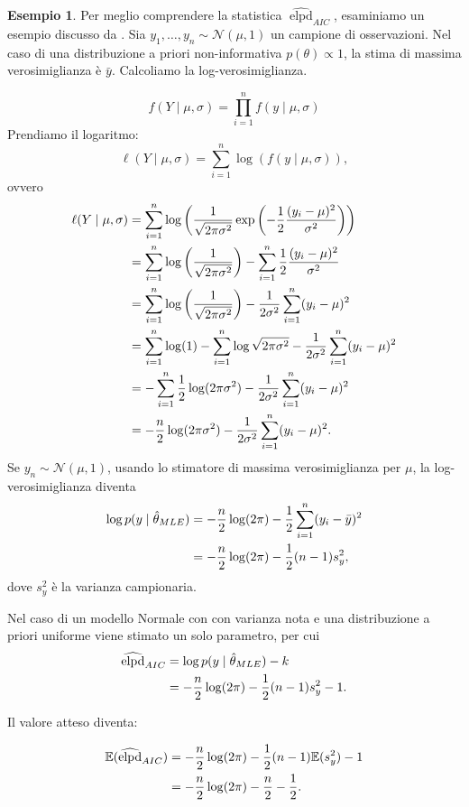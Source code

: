 \documentclass[
  10pt,
  italian,
  a4paper,
  extrafontsizes,onecolumn,openright
  ]{memoir}
\newcommand{\E}{\mathbb{E}} %
\DeclareMathOperator{\elpd}{elpd} %
\theoremstyle{definition}
\theoremstyle{definition}
\newtheorem{example}{Esempio}[chapter]
\theoremstyle{definition}
\theoremstyle{definition}
\theoremstyle{remark}
\begin{document}
\begin{example}
Per meglio comprendere la statistica \(\widehat{\elpd}_{AIC}\), esaminiamo un esempio discusso da \textcite{gelman2014understanding}. Sia \(y_1, \dots, y_n \sim \mathcal{N}(\mu, 1)\) un campione di osservazioni. Nel caso di una distribuzione a priori non-informativa \(p(\theta) \propto 1\), la stima di massima verosimiglianza è \(\bar{y}\). Calcoliamo la log-verosimiglianza.

\[
f(Y \mid \mu, \sigma) = \prod_{i=1}^n f(y \mid \mu, \sigma)
\]
Prendiamo il logaritmo:
\[
\ell(Y \mid \mu, \sigma) = \sum_{i=1}^n \log (f(y \mid \mu, \sigma)),
\]
ovvero
\begin{align}
\ell(Y \mid \mu, \sigma) &= \sum_{i=1}^n \log \left( \frac {1}{{\sqrt {2\pi\sigma^2 }}}\exp \left(-{\frac {1}{2}}{\frac {(y_i-\mu )^{2}}{\sigma^{2}}}\right) \right)\notag\\
&= \sum_{i=1}^n \log \left( \frac {1}{{\sqrt {2\pi \sigma^2}}} \right) - \sum_{i=1}^n{\frac {1}{2}}{\frac {(y_i-\mu )^{2}}{\sigma ^{2}}} \notag\\
&= \sum_{i=1}^n \log \left( \frac {1}{{\sqrt {2\pi \sigma^2}}} \right) - \frac{1}{2\sigma^2}\sum_{i=1}^n (y_i-\mu )^{2} \notag \\
&= \sum_{i=1}^n \log (1) - \sum_{i=1}^n\log \sqrt{2\pi \sigma^2} - \frac{1}{2\sigma^2}\sum_{i=1}^n (y_i-\mu )^{2} \notag\\
&= - \sum_{i=1}^n\frac{1}{2}  \log (2\pi\sigma^2) - \frac{1}{2\sigma^2}\sum_{i=1}^n (y_i-\mu )^{2} \notag\\
&= - \frac{n}{2}  \log (2\pi\sigma^2) - \frac{1}{2\sigma^2}\sum_{i=1}^n (y_i-\mu )^{2}. \notag
\end{align}
Se \(y_n \sim \mathcal{N}(\mu, 1)\), usando lo stimatore di massima verosimiglianza per \(\mu\), la log-verosimiglianza diventa
\begin{align}
\log p(y \mid \hat{\theta}_{MLE}) &= -\frac{n}{2} \log (2\pi) - \frac{1}{2}\sum_{i=1}^n (y_i - \bar{y})^2 \notag\\
&= -\frac{n}{2} \log (2\pi) - \frac{1}{2} (n-1)s_y^2,
\end{align}
\noindent
dove \(s_y^2\) è la varianza campionaria.

Nel caso di un modello Normale con con varianza nota e una distribuzione a priori uniforme viene stimato un solo parametro, per cui
\begin{align}
\widehat{\elpd}_{AIC} &= \log p(y \mid \hat{\theta}_{MLE}) - k \notag \\
&= -\frac{n}{2} \log (2\pi) - \frac{1}{2} (n-1)s_y^2 - 1.
\end{align}

\noindent
Il valore atteso diventa:

\begin{align}
\E(\widehat{\elpd}_{AIC}) &= -\frac{n}{2} \log (2\pi) - \frac{1}{2} (n-1)\E(s_y^2) - 1\notag \\
&= -\frac{n}{2} \log (2\pi) - \frac{n}{2} - \frac{1}{2}.
\end{align}
\end{example}
\end{document}
